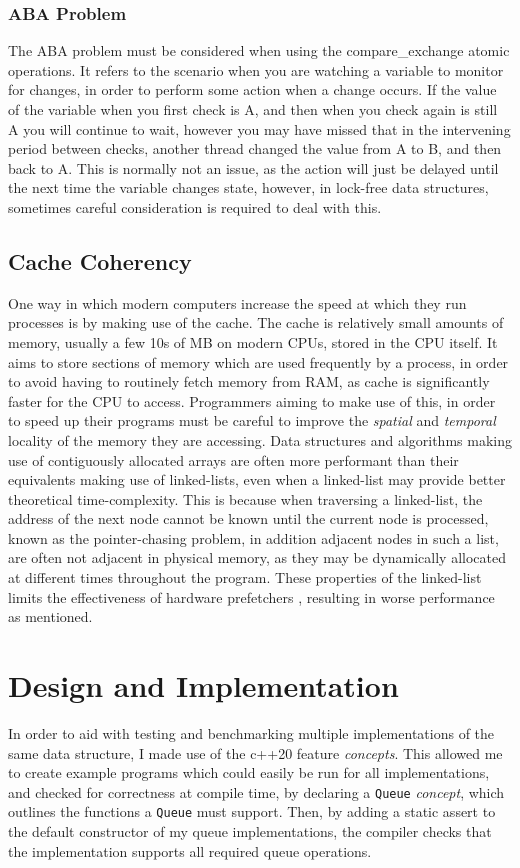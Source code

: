 \documentclass{article}
\begin{document}
\subsubsection{ABA Problem}
The ABA problem must be considered when using the compare\_exchange atomic
operations. It refers to the scenario when you are watching a variable to
monitor for changes, in order to perform some action when a change occurs. If
the value of the variable when you first check is A, and then when you check
again is still A you will continue to wait, however you may have missed that in
the intervening period between checks, another thread changed the value from A
to B, and then back to A. This is normally not an issue, as the action will just
be delayed until the next time the variable changes state, however, in lock-free
data structures, sometimes careful consideration is required to deal with this.

\subsection{Cache Coherency}
One way in which modern computers increase the speed at which they run processes
is by making use of the cache. The cache is relatively small amounts of memory,
usually a few 10s of MB on modern CPUs, stored in the CPU itself. It aims to
store sections of memory which are used frequently by a process, in order to
avoid having to routinely fetch memory from RAM, as cache is significantly
faster for the CPU to access. Programmers aiming to make use of this, in order
to speed up their programs must be careful to improve the \textit{spatial} and
\textit{temporal} locality of the memory they are accessing. Data structures and
algorithms making use of contiguously allocated arrays are often more performant
than their equivalents making use of linked-lists, even when a linked-list may
provide better theoretical time-complexity. This is because when traversing a
linked-list, the address of the next node cannot be known until the current node
is processed, known as the pointer-chasing problem, in addition adjacent nodes
in such a list, are often not adjacent in physical memory, as they may be
dynamically allocated at different times throughout the program. These
properties of the linked-list limits the effectiveness of hardware prefetchers
\citep{yang2004tolerating}, resulting in worse performance as mentioned.

\section{Design and Implementation}
In order to aid with testing and benchmarking multiple implementations of the
same data structure, I made use of the c++20 feature \textit{concepts}. This
allowed me to create example programs which could easily be run for all
implementations, and checked for correctness at compile time, by declaring a
\verb|Queue| \textit{concept}, which outlines the functions a \verb|Queue| must
support. Then, by adding a static assert to the default constructor of my queue
implementations, the compiler checks that the implementation supports all
required queue operations.
\end{document}
